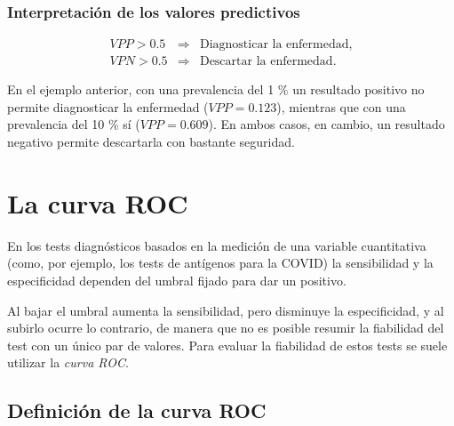 \documentclass[
  spanish,
  a4paper,
]{scrreport}
\theoremstyle{definition}
\theoremstyle{definition}
\theoremstyle{remark}
\begin{document}
\subsection{Interpretación de los valores
predictivos}\label{interpretaciuxf3n-de-los-valores-predictivos}

\begin{tcolorbox}[enhanced jigsaw, arc=.35mm, bottomrule=.15mm, bottomtitle=1mm, breakable, colback=white, colbacktitle=quarto-callout-note-color!10!white, colframe=quarto-callout-note-color-frame, coltitle=black, left=2mm, leftrule=.75mm, opacityback=0, opacitybacktitle=0.6, rightrule=.15mm, title=\textcolor{quarto-callout-note-color}{\faInfo}\hspace{0.5em}{Interpretación}, titlerule=0mm, toprule=.15mm, toptitle=1mm]

\[
\begin{array}{rcl}
VPP>0.5 & \Rightarrow & \mbox{Diagnosticar la enfermedad},\\
VPN>0.5 & \Rightarrow & \mbox{Descartar la enfermedad}.
\end{array}
\]

\end{tcolorbox}

En el ejemplo anterior, con una prevalencia del 1 \% un resultado
positivo no permite diagnosticar la enfermedad (\(VPP=0.123\)), mientras
que con una prevalencia del 10 \% sí (\(VPP=0.609\)). En ambos casos, en
cambio, un resultado negativo permite descartarla con bastante
seguridad.


\chapter{La curva ROC}\label{sec-curva-roc}

En los tests diagnósticos basados en la medición de una variable
cuantitativa (como, por ejemplo, los tests de antígenos para la COVID)
la sensibilidad y la especificidad dependen del umbral fijado para dar
un positivo.

Al bajar el umbral aumenta la sensibilidad, pero disminuye la
especificidad, y al subirlo ocurre lo contrario, de manera que no es
posible resumir la fiabilidad del test con un único par de valores. Para
evaluar la fiabilidad de estos tests se suele utilizar la \emph{curva
ROC}.

\section{Definición de la curva
ROC}\label{definiciuxf3n-de-la-curva-roc}
\end{document}
